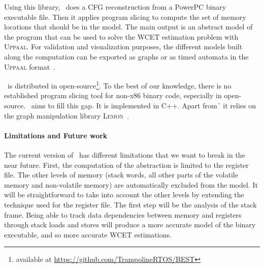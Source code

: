 {    %
  
    Using this library, \best\ does a CFG reconstruction from a PowerPC binary
    executable file. Then it applies program slicing to compute the set of
    memory locations that should be in the model. The main output is an abstract
    model of the program that can be used to solve the WCET estimation problem
    with \textsc{Uppaal}. For validation and visualization purposes, the
    different models built along the computation can be exported as graphs or as
    timed automata in the \textsc{Uppaal} format~\cite{LPY97}.


  \best\ is distributed in open-source\footnote{available at
    \url{https://github.com/TrampolineRTOS/BEST}}. To the best of our knowledge,
  there is no established program slicing tool for non-x86 binary code,
  especially in open-source. \best\ aims to fill this gap. It is implemented in
  C++. Apart from \h\, it relies on the graph manipulation library
  \textsc{Lemon}~\cite{DJK11}.
  

  \paragraph*{Limitations and Future work}

    The current version of \best\ has different limitations that we want to
    break in the near future. First, the computation of the abstraction is
    limited to the register file. The other levels of memory (stack words, all
    other parts of the volatile memory and non-volatile memory) are
    automatically excluded from the model. It will be straightforward to take
    into account the other levels by extending the technique used for the
    register file. The first step will be the analysis of the stack frame. Being
    able to track data dependencies between memory and registers through stack
    loads and stores will produce a more accurate model of the binary
    executable, and so more accurate WCET estimations.

}
